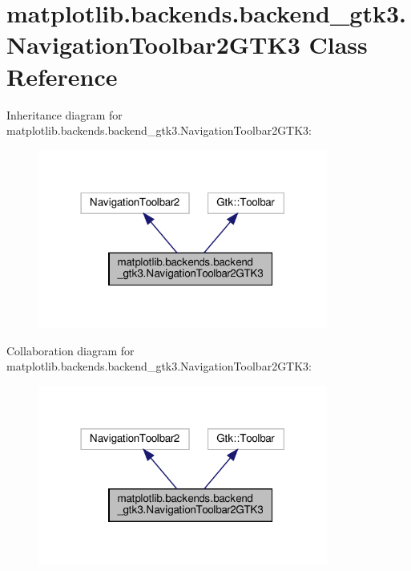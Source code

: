 \hypertarget{classmatplotlib_1_1backends_1_1backend__gtk3_1_1NavigationToolbar2GTK3}{}\section{matplotlib.\+backends.\+backend\+\_\+gtk3.\+Navigation\+Toolbar2\+G\+T\+K3 Class Reference}
\label{classmatplotlib_1_1backends_1_1backend__gtk3_1_1NavigationToolbar2GTK3}


Inheritance diagram for matplotlib.\+backends.\+backend\+\_\+gtk3.\+Navigation\+Toolbar2\+G\+T\+K3\+:
\nopagebreak
\begin{figure}[H]
\begin{center}
\leavevmode
\includegraphics[width=270pt]{classmatplotlib_1_1backends_1_1backend__gtk3_1_1NavigationToolbar2GTK3__inherit__graph}
\end{center}
\end{figure}


Collaboration diagram for matplotlib.\+backends.\+backend\+\_\+gtk3.\+Navigation\+Toolbar2\+G\+T\+K3\+:
\nopagebreak
\begin{figure}[H]
\begin{center}
\leavevmode
\includegraphics[width=270pt]{classmatplotlib_1_1backends_1_1backend__gtk3_1_1NavigationToolbar2GTK3__coll__graph}
\end{center}
\end{figure}
